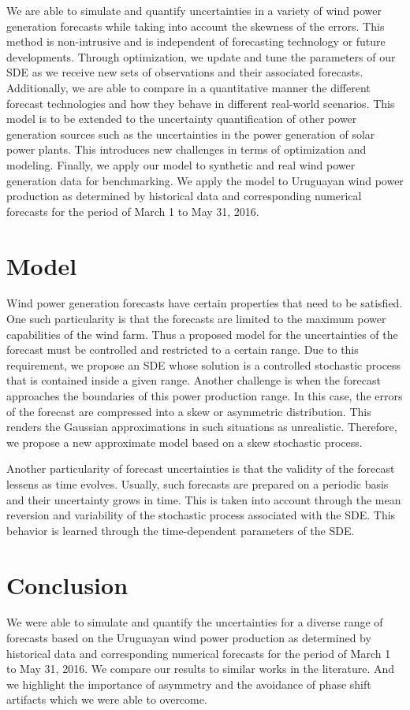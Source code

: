 \documentclass[12pt]{article}
\theoremstyle{definition}
\theoremstyle{remark}
\begin{document}
    We are able to simulate and quantify uncertainties in a variety of wind power generation forecasts while taking into account the skewness of the errors. This method is non-intrusive and is independent of forecasting technology or future developments. Through optimization, we update and tune the parameters of our SDE as we receive new sets of observations and their associated forecasts. Additionally, we are able to compare in a quantitative manner the different forecast technologies and how they behave in different real-world scenarios. This model is to be extended to the uncertainty quantification of other power generation sources such as the uncertainties in the power generation of solar power plants. This introduces new challenges in terms of optimization and modeling. Finally, we apply our model to synthetic and real wind power generation data for benchmarking. We apply the model to Uruguayan wind power production as determined by historical data and corresponding numerical forecasts for the period of March 1 to May 31, 2016.


\section{Model}
Wind power generation forecasts have certain properties that need to be satisfied. One such particularity is that the forecasts are limited to the maximum power capabilities of the wind farm. Thus a proposed model for the uncertainties of the forecast must be controlled and restricted to a certain range. Due to this requirement, we propose an SDE whose solution is a controlled stochastic process that is contained inside a given range. Another challenge is when the forecast approaches the boundaries of this power production range. In this case, the errors of the forecast are compressed into a skew or asymmetric distribution. This renders the Gaussian approximations in such situations as unrealistic. Therefore, we propose a new approximate model based on a skew stochastic process.

Another particularity of forecast uncertainties is that the validity of the forecast lessens as time evolves. Usually, such forecasts are prepared on a periodic basis and their uncertainty grows in time. This is taken into account through the mean reversion and variability of the stochastic process associated with the SDE. This behavior is learned through the time-dependent parameters of the SDE.

\section{Conclusion}
We were able to simulate and quantify the uncertainties for a diverse range of forecasts based on the Uruguayan wind power production as determined by historical data and corresponding numerical forecasts for the period of March 1 to May 31, 2016. We compare our results to similar works in the literature. And we highlight the importance of asymmetry and the avoidance of phase shift artifacts which we were able to overcome.
\end{document}
